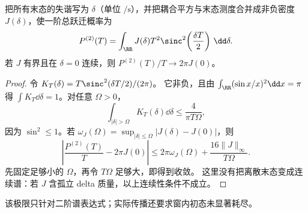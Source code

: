 \begin{proposition}[有限时间谱核的归一化与黄金律时间窗]
把所有末态的失谐写为 $\delta$（单位 $\si{\per\second}$），并把耦合平方与末态测度合并成非负密度
$J(\delta)$，使一阶总跃迁概率为
\begin{equation}
P^{(2)}(T)=\int_{\RR}J(\delta)T^2
\sinc^2\!\left(\frac{\delta T}{2}\right)\,\dd\delta.
\label{eq:feqo-finite-time-spectral-density-probability}
\end{equation}
若 $J$ 有界且在 $\delta=0$ 连续，则
$P^{(2)}(T)/T\to2\pi J(0)$。
\end{proposition}
\begin{proof}
令 $K_T(\delta)=T\sinc^2(\delta T/2)/(2\pi)$。
它非负，且由 $\int_{\RR}(\sin x/x)^2\dd x=\pi$ 得
$\int K_T\dd\delta=1$。对任意 $\Omega>0$，
\[
\int_{|\delta|>\Omega}K_T(\delta)\dd\delta
\le\frac{4}{\pi T\Omega},
\]
因为 $\sin^2\le1$。若 $\omega_J(\Omega)
=\sup_{|\delta|\le\Omega}|J(\delta)-J(0)|$，则
\[
\left|\frac{P^{(2)}(T)}T-2\pi J(0)\right|
\le2\pi\omega_J(\Omega)+\frac{16\|J\|_\infty}{T\Omega}.
\]
先固定足够小的 $\Omega$，再令 $T\Omega$ 足够大，即得到收敛。
这里没有把离散末态变成连续谱：若 $J$ 含孤立 delta 质量，以上连续性条件不成立。
\end{proof}

该极限只针对二阶谱表达式；实际传播还要求窗内初态未显著耗尽。

